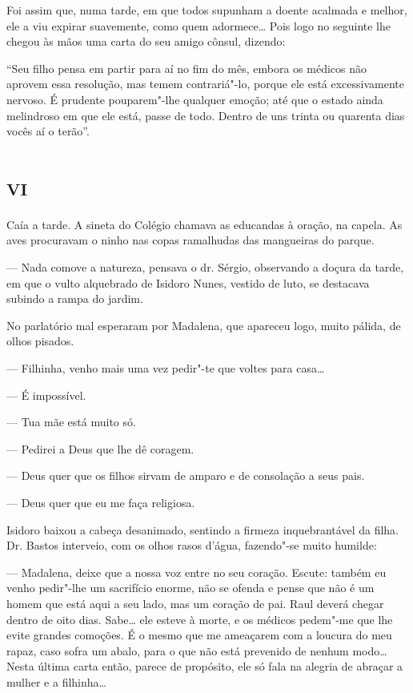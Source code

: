 Foi assim que, numa tarde, em que todos supunham a doente acalmada e
melhor, ele a viu expirar suavemente, como quem adormece\ldots{} Pois logo no
seguinte lhe chegou às mãos uma carta do seu amigo cônsul, dizendo:

``Seu filho pensa em partir para aí no fim do mês, embora os médicos não
aprovem essa resolução, mas temem contrariá"-lo, porque ele está
excessivamente nervoso. É prudente pouparem"-lhe qualquer emoção; até que
o estado ainda melindroso em que ele está, passe de todo. Dentro de uns
trinta ou quarenta dias vocês aí o terão''.

\section{\textsc{vi}}

Caía a tarde. A sineta do Colégio chamava as educandas à oração, na
capela. As aves procuravam o ninho nas copas ramalhudas das mangueiras
do parque.

--- Nada comove a natureza, pensava o dr. Sérgio, observando a doçura da
tarde, em que o vulto alquebrado de Isidoro Nunes, vestido de luto, se
destacava subindo a rampa do jardim.

No parlatório mal esperaram por Madalena, que apareceu logo, muito
pálida, de olhos pisados.

--- Filhinha, venho mais uma vez pedir"-te que voltes para casa\ldots{}

--- É impossível.

--- Tua mãe está muito só.

--- Pedirei a Deus que lhe dê coragem.

--- Deus quer que os filhos sirvam de amparo e de consolação a seus
pais.

--- Deus quer que eu me faça religiosa.

Isidoro baixou a cabeça desanimado, sentindo a firmeza inquebrantável da
filha. Dr. Bastos interveio, com os olhos rasos d'água, fazendo"-se muito
humilde:

--- Madalena, deixe que a nossa voz entre no seu coração. Escute: também
eu venho pedir"-lhe um sacrifício enorme, não se ofenda e pense que não é
um homem que está aqui a seu lado, mas um coração de pai. Raul deverá
chegar dentro de oito dias. Sabe\ldots{} ele esteve à morte, e os médicos
pedem"-me que lhe evite grandes comoções. É o mesmo que me ameaçarem com
a loucura do meu rapaz, caso sofra um abalo, para o que não está
prevenido de nenhum modo\ldots{} Nesta última carta então, parece de
propósito, ele só fala na alegria de abraçar a mulher e a filhinha\ldots{}


